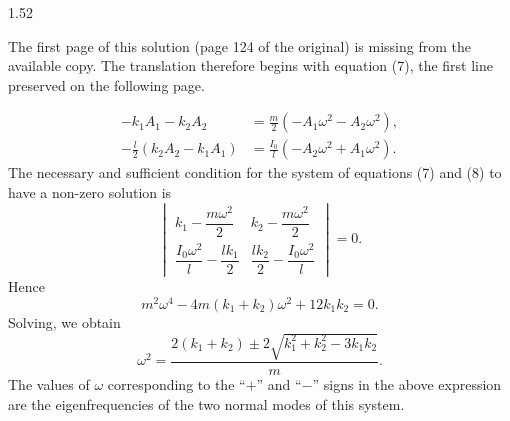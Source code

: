 \begin{solution}{1.52}
\begin{note}
The first page of this solution (page 124 of the original) is missing from the available copy.
The translation therefore begins with equation (7), the first line preserved on the following
page.
\end{note}
\begin{align}
-k_1A_1-k_2A_2 &= \frac{m}{2}\left(-A_1\omega^2-A_2\omega^2\right), \tag{7}\\
-\frac{l}{2}\left(k_2A_2-k_1A_1\right)
&= \frac{I_0}{l}\left(-A_2\omega^2+A_1\omega^2\right). \tag{8}
\end{align}
The necessary and sufficient condition for the system of equations (7) and (8) to have a
non-zero solution is
\begin{equation*}
\begin{vmatrix}
k_1-\dfrac{m\omega^2}{2} & k_2-\dfrac{m\omega^2}{2}\\[8pt]
\dfrac{I_0\omega^2}{l}-\dfrac{lk_1}{2} & \dfrac{lk_2}{2}-\dfrac{I_0\omega^2}{l}
\end{vmatrix}=0.
\end{equation*}
Hence
\begin{equation*}
m^2\omega^4-4m(k_1+k_2)\omega^2+12k_1k_2=0.
\end{equation*}
Solving, we obtain
\begin{equation*}
\omega^2=\frac{2(k_1+k_2)\pm 2\sqrt{k_1^2+k_2^2-3k_1k_2}}{m}.
\end{equation*}
The values of $\omega$ corresponding to the ``$+$'' and ``$-$'' signs in the above expression
are the eigenfrequencies of the two normal modes of this system.
\end{solution}

